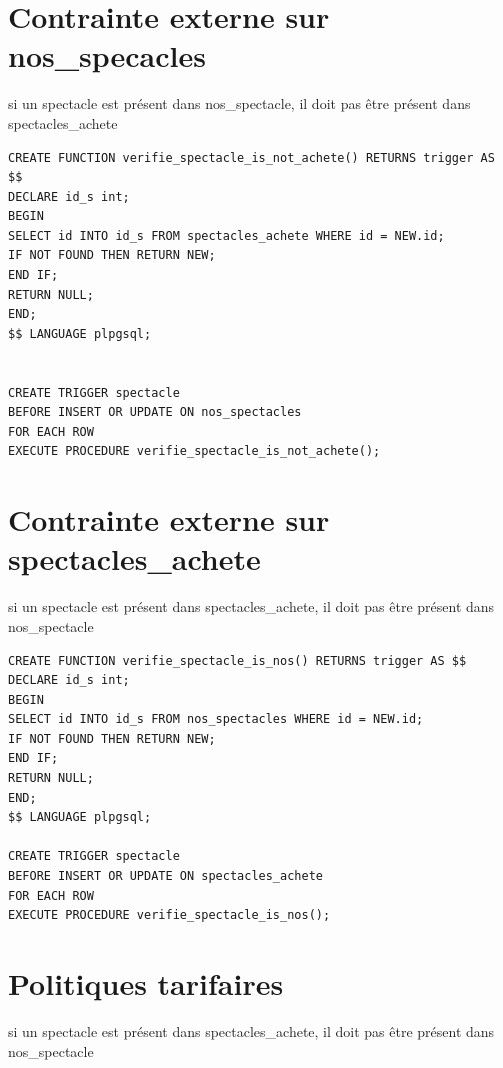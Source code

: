 \documentclass[10pt]{report}
\begin{document}
\section{Contrainte externe sur nos\_specacles}
si un spectacle est présent dans nos\_spectacle, il doit pas être présent dans spectacles\_achete
\begin{lstlisting}
CREATE FUNCTION verifie_spectacle_is_not_achete() RETURNS trigger AS $$ 
DECLARE id_s int;
BEGIN
SELECT id INTO id_s FROM spectacles_achete WHERE id = NEW.id;
IF NOT FOUND THEN RETURN NEW;
END IF;
RETURN NULL;
END; 
$$ LANGUAGE plpgsql;


CREATE TRIGGER spectacle
BEFORE INSERT OR UPDATE ON nos_spectacles
FOR EACH ROW
EXECUTE PROCEDURE verifie_spectacle_is_not_achete();
\end{lstlisting}

\section{Contrainte externe sur spectacles\_achete}
si un spectacle est présent dans spectacles\_achete, il doit pas être présent dans nos\_spectacle
\begin{lstlisting}
CREATE FUNCTION verifie_spectacle_is_nos() RETURNS trigger AS $$ 
DECLARE id_s int;
BEGIN
SELECT id INTO id_s FROM nos_spectacles WHERE id = NEW.id;
IF NOT FOUND THEN RETURN NEW;
END IF;
RETURN NULL;
END; 
$$ LANGUAGE plpgsql;

CREATE TRIGGER spectacle
BEFORE INSERT OR UPDATE ON spectacles_achete
FOR EACH ROW
EXECUTE PROCEDURE verifie_spectacle_is_nos();
\end{lstlisting}

\section{Politiques tarifaires}
si un spectacle est présent dans spectacles\_achete, il doit pas être présent dans nos\_spectacle
\begin{lstlisting}

\end{lstlisting}
\end{document}
